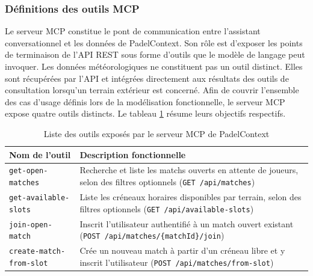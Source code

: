 \documentclass[12pt]{article}
\begin{document}
\subsubsection{Définitions des outils MCP}
Le serveur MCP constitue le pont de communication entre l'assistant conversationnel et les données de PadelContext. Son rôle est d'exposer les points de terminaison de l'API REST sous forme d'outils que le modèle de langage peut invoquer. Les données météorologiques ne constituent pas un outil distinct. Elles sont récupérées par l'API et intégrées directement aux résultats des outils de consultation lorsqu'un terrain extérieur est concerné.
\newline\newline
Afin de couvrir l'ensemble des cas d'usage définis lors de la modélisation fonctionnelle, le serveur MCP expose quatre outils distincts. Le tableau \ref{tab:mcp_tools} résume leurs objectifs respectifs.
\vspace{0.5cm}
\begin{table}[H]
    \centering
    {\small
    \begin{tabularx}{\textwidth}{|l|X|}
    \hline
        \rowcolor[gray]{0.9}
        \textbf{Nom de l'outil} & \textbf{Description fonctionnelle} \\ \hline
        \texttt{get-open-matches} & Recherche et liste les matchs ouverts en attente de joueurs, selon des filtres optionnels (\texttt{GET /api/matches}) \\ \hline
        \texttt{get-available-slots} & Liste les créneaux horaires disponibles par terrain, selon des filtres optionnels (\texttt{GET /api/available-slots}) \\ \hline
        \texttt{join-open-match} & Inscrit l'utilisateur authentifié à un match ouvert existant (\texttt{POST /api/matches/\{matchId\}/join}) \\ \hline
        \texttt{create-match-from-slot} & Crée un nouveau match à partir d'un créneau libre et y inscrit l'utilisateur (\texttt{POST /api/matches/from-slot}) \\ \hline
    \end{tabularx}
    }
    \caption{Liste des outils exposés par le serveur MCP de PadelContext}
    \label{tab:mcp_tools}
\end{table}
\vspace{0.4cm}
\end{document}
